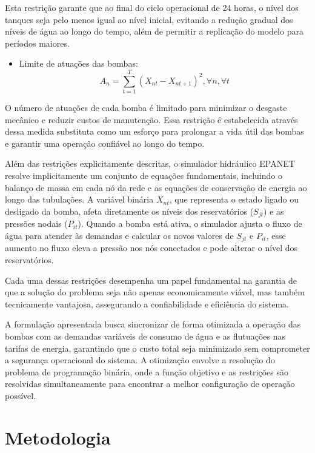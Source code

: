 \documentclass[12pt,a4paper,oneside,linenumbers=off,latinmodern=off,timesnews=off,english,spanish]{rctart-class/rctart}
\begin{document}
Esta restrição garante que ao final do ciclo operacional de 24 horas, o nível dos tanques seja pelo menos igual ao nível inicial, evitando a redução gradual dos níveis de água ao longo do tempo, além de permitir a replicação do modelo para períodos maiores.

\begin{itemize}
\item Limite de atuações das bombas:
  \[
  A_n = \sum^{T}_{t = 1}(X_{nt}- X_{nt+1})^{2}, \forall n, \forall t
  \]
\end{itemize}

O número de atuações de cada bomba é limitado para minimizar o desgaste mecânico e reduzir custos de manutenção. Essa restrição é estabelecida através dessa medida substituta como um esforço para prolongar a vida útil das bombas e garantir uma operação confiável ao longo do tempo. 

Além das restrições explicitamente descritas, o simulador hidráulico EPANET resolve implicitamente um conjunto de equações fundamentais, incluindo o balanço de massa em cada nó da rede e as equações de conservação de energia ao longo das tubulações. A variável binária \( X_{nt} \), que representa o estado ligado ou desligado da bomba, afeta diretamente os níveis dos reservatórios (\( S_{jt} \)) e as pressões nodais (\( P_{it} \)). Quando a bomba está ativa, o simulador ajusta o fluxo de água para atender às demandas e calcular os novos valores de \( S_{jt} \) e \( P_{it} \), esse aumento no fluxo eleva a pressão nos nós conectados e pode alterar o nível dos reservatórios.

Cada uma dessas restrições desempenha um papel fundamental na garantia de que a solução do problema seja não apenas economicamente viável, mas também tecnicamente vantajosa, assegurando a confiabilidade e eficiência do sistema.

A formulação apresentada busca sincronizar de forma otimizada a operação das bombas com as demandas variáveis de consumo de água e as flutuações nas tarifas de energia, garantindo que o custo total seja minimizado sem comprometer a segurança operacional do sistema. A otimização envolve a resolução do problema de programação binária, onde a função objetivo e as restrições são resolvidas simultaneamente para encontrar a melhor configuração de operação possível.


\section{Metodologia}
\end{document}
